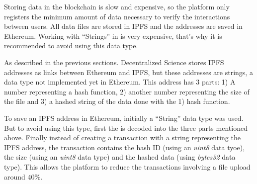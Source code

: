 \begin{itemize}
   Storing data in the
  blockchain is slow and expensive, so the platform only registers the minimum
  amount of data necessary to verify the interactions between users. All data
  files are stored in IPFS and the addresses are saved in Ethereum.  Working with ``Strings'' in  is very
  expensive, that's why it is recommended to avoid using this data type.

  As described in the previous sections. Decentralized Science stores IPFS
  addresses as links between Ethereum and IPFS, but these addresses are
   strings, a data type not implemented yet in Ethereum. This address
  has 3 parts: 1) A number representing a hash function, 2) another number
  representing the size of the file and 3) a hashed string of the data done with
  the 1) hash function.

  To save an IPFS address in Ethereum, initially a ``String'' data type was
  used. But to avoid using this type, first the  is decoded into the
  three parts mentioned above. Finally instead of creating a transaction with a
  string representing the IPFS address, the transaction contains the hash ID
  (using an \emph{uint8} data tyoe), the size (using an \emph{uint8} data type)
  and the hashed data (using \emph{bytes32} data type). This allows the platform
  to reduce the transactions involving a file upload around $40\%$.
\end{itemize}

